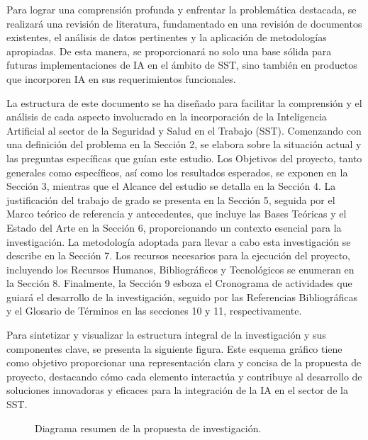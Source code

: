 Para lograr una comprensión profunda y enfrentar la problemática destacada, se realizará una revisión de literatura, fundamentado en una revisión de documentos existentes, el análisis de datos pertinentes y la aplicación de metodologías apropiadas. De esta manera, se proporcionará no solo una base sólida para futuras implementaciones de IA en el ámbito de SST, sino también en productos que incorporen IA en sus requerimientos funcionales.

La estructura de este documento se ha diseñado para facilitar la comprensión y el análisis de cada aspecto involucrado en la incorporación de la Inteligencia Artificial al sector de la Seguridad y Salud en el Trabajo (SST). Comenzando con una definición del problema en la Sección 2, se elabora sobre la situación actual y las preguntas específicas que guían este estudio. Los Objetivos del proyecto, tanto generales como específicos, así como los resultados esperados, se exponen en la Sección 3, mientras que el Alcance del estudio se detalla en la Sección 4. La justificación del trabajo de grado se presenta en la Sección 5, seguida por el Marco teórico de referencia y antecedentes, que incluye las Bases Teóricas y el Estado del Arte en la Sección 6, proporcionando un contexto esencial para la investigación. La metodología adoptada para llevar a cabo esta investigación se describe en la Sección 7. Los recursos necesarios para la ejecución del proyecto, incluyendo los Recursos Humanos, Bibliográficos y Tecnológicos se enumeran en la Sección 8. Finalmente, la Sección 9 esboza el Cronograma de actividades que guiará el desarrollo de la investigación, seguido por las Referencias Bibliográficas y el Glosario de Términos en las secciones 10 y 11, respectivamente.

Para sintetizar y visualizar la estructura integral de la investigación y sus componentes clave, se presenta la siguiente figura. Este esquema gráfico tiene como objetivo proporcionar una representación clara y concisa de la propuesta de proyecto, destacando cómo cada elemento interactúa y contribuye al desarrollo de soluciones innovadoras y eficaces para la integración de la IA en el sector de la SST.

\begin{figure}[H]
\centering
{}
\caption{Diagrama resumen de la propuesta de investigación.}
\label{fig:mi_figura}
\end{figure}